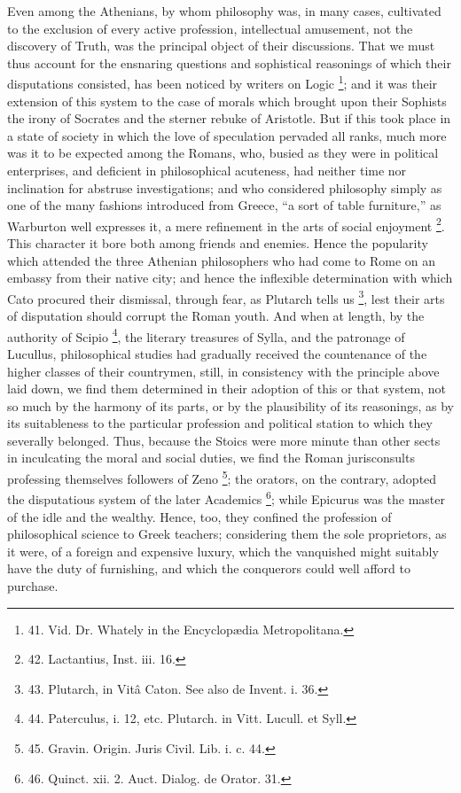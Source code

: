 Even among the Athenians, by
whom philosophy was, in many cases, cultivated to the exclusion of
every active profession, intellectual amusement, not the discovery of
Truth, was the principal object of their discussions. That we must
thus account for the ensnaring questions and sophistical reasonings of
which their disputations consisted, has been noticed by writers on
Logic \footnote{41. Vid. Dr. Whately in the
Encyclopædia Metropolitana.}; and it was
their extension of this system to the case of morals which brought
upon their Sophists the irony of Socrates and the sterner rebuke of
Aristotle. But if this took place in a state of society in which the
love of speculation pervaded all ranks, much more was it to be
expected among the Romans, who, busied as they were in political
enterprises, and deficient in philosophical acuteness, had neither
time nor inclination for abstruse investigations; and who considered
philosophy simply as one of the many fashions introduced from Greece, ``a
sort of table furniture,'' as Warburton well expresses it, a mere
refinement in the arts of social enjoyment \footnote{42. Lactantius, Inst. iii. 16.}. This character it bore both among friends and enemies. Hence
the popularity which attended the three Athenian philosophers who had
come to Rome on an embassy from their native city; and hence the
inflexible determination with which Cato procured their dismissal,
through fear, as Plutarch tells us \footnote{43. Plutarch, in Vitâ Caton.
See also de Invent. i. 36.}, lest their arts of disputation should corrupt the Roman
youth. And when at length, by the authority of Scipio \footnote{44. Paterculus, i. 12, etc.
Plutarch. in Vitt. Lucull. et Syll.}, the literary treasures of Sylla, and the patronage of
Lucullus, philosophical studies had gradually received the countenance
of the higher classes of their countrymen, still, in consistency with
the principle above laid down, we find them determined in their
adoption of this or that system, not so much by the harmony of its
parts, or by the plausibility of its reasonings, as by its
suitableness to the particular profession and political station to
which they severally belonged. Thus, because the Stoics were more
minute than other sects in inculcating the moral and social duties, we
find the Roman jurisconsults professing themselves followers of Zeno \footnote{45. Gravin. Origin. Juris
Civil. Lib. i. c. 44.}; the orators, on the contrary, adopted the disputatious system
of the later Academics \footnote{46. Quinct. xii. 2. Auct.
Dialog. de Orator. 31.};
while Epicurus was the master of the idle and the wealthy. Hence, too,
they confined the profession of philosophical science to Greek
teachers; considering them the sole proprietors, as it were, of a
foreign and expensive luxury, which the vanquished might suitably have
the duty of furnishing, and which the conquerors could well afford to
purchase.

